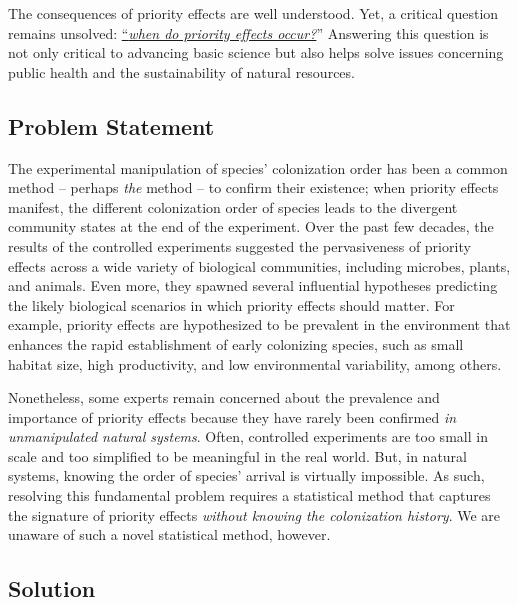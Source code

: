 \documentclass[12pt, class=article, crop=false]{standalone}
\begin{document}
The consequences of priority effects are well understood. Yet, a critical question remains unsolved: \ul{``\textit{when do priority effects occur?}}'' 
Answering this question is not only critical to advancing basic science but also helps solve issues concerning public health and the sustainability of natural resources.

\subsection*{Problem Statement}

The experimental manipulation of species' colonization order has been a common method -- perhaps \textit{the} method -- to confirm their existence; when priority effects manifest, the different colonization order of species leads to the divergent community states at the end of the experiment.
Over the past few decades, the results of the controlled experiments suggested the pervasiveness of priority effects across a wide variety of biological communities, including microbes, plants, and animals.
Even more, they spawned several influential hypotheses predicting the likely biological scenarios in which priority effects should matter.
For example, priority effects are hypothesized to be prevalent in the environment that enhances the rapid establishment of early colonizing species, such as small habitat size, high productivity, and low environmental variability, among others.

Nonetheless, some experts remain concerned about the prevalence and importance of priority effects because they have rarely been confirmed \textit{in unmanipulated natural systems}. Often, controlled experiments are too small in scale and too simplified to be meaningful in the real world.
But, in natural systems, knowing the order of species' arrival is virtually impossible.
As such, resolving this fundamental problem requires a statistical method that captures the signature of priority effects \textit{without knowing the colonization history}.
We are unaware of such a novel statistical method, however. 

\subsection*{Solution}
\end{document}
